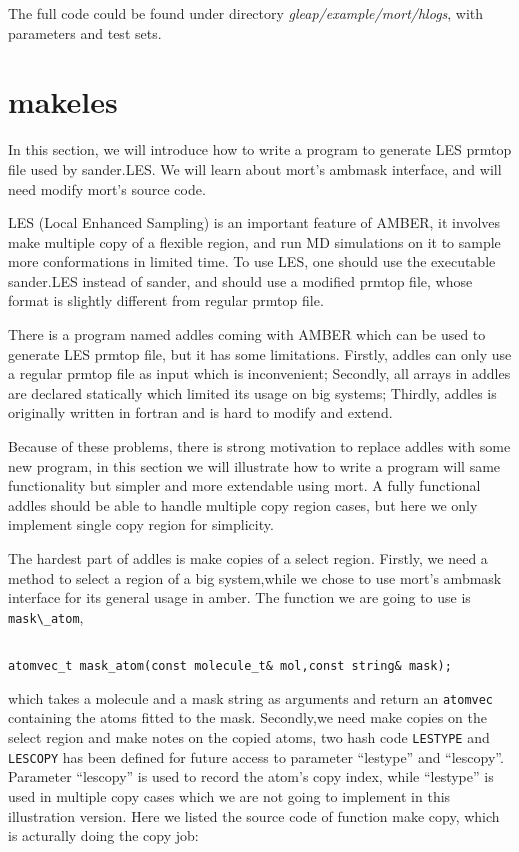 \documentclass[letterpaper]{book}
\begin{document}
  The full code could be found under directory {\it gleap/example/mort/hlogs}, with parameters 
and test sets.

\section{makeles}
  In this section, we will introduce how to write a program to generate LES  prmtop file used by 
sander.LES. We will learn about mort's ambmask interface, and will need modify mort's source 
code.

  LES (Local Enhanced Sampling) is an important feature of AMBER, it involves make multiple 
copy of a flexible region, and run MD simulations on it to sample more conformations in limited 
time. To use LES, one should use the executable sander.LES instead of sander, and should use a 
modified prmtop file, whose format is slightly different from regular prmtop file.

  There is a program named addles coming with AMBER which can be used to generate 
LES prmtop file, but it has some limitations. Firstly, addles can only use a regular prmtop 
file as input which is  inconvenient; Secondly, all arrays in addles are declared 
statically which limited its usage on big systems; Thirdly, addles is originally written in 
fortran and is hard to modify and extend.

  Because of these problems, there is strong motivation to replace addles with some new program,
in this section we will illustrate how to write a program will same functionality but simpler 
and more extendable using mort. A fully functional addles should be able to handle multiple copy
region cases, but here we only implement single copy region for simplicity.

  The hardest part of addles is make copies of a select region. Firstly, we need a method to 
select a region of a big system,while we chose to use mort's ambmask interface for its general 
usage in amber. The function we are going to use is \lstinline$mask\_atom$,

\begin{lstlisting}

atomvec_t mask_atom(const molecule_t& mol,const string& mask);

\end{lstlisting}

which takes a molecule and a mask string as arguments and return an \lstinline$atomvec$ containing the atoms 
fitted to the mask. Secondly,we need make copies on the select region and make notes on the 
copied atoms, two hash code \lstinline$LESTYPE$ and \lstinline$LESCOPY$ has been defined for future
access to parameter ``lestype'' and ``lescopy''. Parameter ``lescopy'' is used to record the atom's 
copy index, while ``lestype'' is used in multiple copy cases which we are not going to implement in 
this illustration version. Here we listed the source code of function make copy, which is acturally 
doing the copy job:
\end{document}
